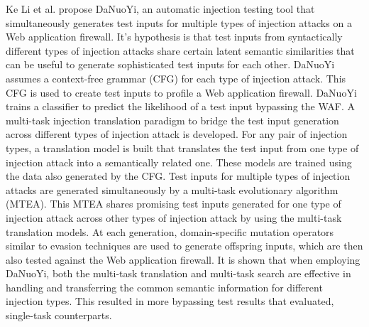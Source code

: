 Ke Li et al. \cite{rw/derLI} propose DaNuoYi, an automatic injection testing tool that simultaneously generates test inputs for multiple types of injection attacks on a Web application firewall. It's hypothesis is that test inputs from syntactically different types of injection attacks share certain latent semantic similarities that can be useful to generate sophisticated test inputs for each other. DaNuoYi assumes a context-free grammar (CFG) for each type of injection attack. This CFG is used to create test inputs to profile a Web application firewall. DaNuoYi trains a classifier to predict the likelihood of a test input bypassing the WAF. A multi-task injection translation paradigm to bridge the test input generation across different types of injection attack is developed. For any pair of injection types, a translation model is built that translates the test input from one type of injection
attack into a semantically related one. These models are trained using the data also generated by the CFG. Test inputs for multiple types of injection attacks are generated simultaneously by a multi-task evolutionary algorithm (MTEA). This MTEA shares promising test inputs generated for one type of injection attack across other types of injection attack by using the multi-task translation models.
At each generation, domain-specific mutation operators similar to evasion techniques are used to generate offspring inputs, which are then also tested against the Web application firewall.
It is shown that when employing DaNuoYi, both the multi-task translation and multi-task search are effective in handling and transferring the common semantic information for different injection types. This resulted in more bypassing test results that evaluated, single-task counterparts.

